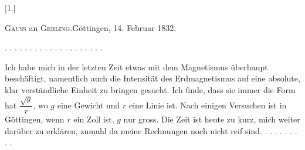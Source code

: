 \clearpage\begingroup{}\NoSourceHead
\begin{center}\Large{}\end{center}
\bigskip\begin{center}[1.]\end{center}
\begin{center}\textsc{Gauss} an \textsc{Gerling}.\quad Göttingen, 14. Februar 1832.\end{center}
\noindent . . . . . . . . . . . . . . . . . . . .\par
\indent Ich habe mich in der letzten Zeit etwas mit dem Magnetismus überhaupt
beschäftigt, namentlich auch die Intensität des Erdmagnetismus auf eine absolute,
klar verständliche Einheit zu bringen gesucht. Ich finde, dass sie
immer die Form hat \(\dfrac{\sqrt g}{r}\), wo \(g\) eine Gewicht und \(r\) eine Linie ist. Nach
einigen Versuchen ist in Göttingen, wenn \(r\) ein Zoll ist, \(g\) nur  gross. Die Zeit ist heute zu kurz, mich weiter darüber zu
erklären, zumahl da meine Rechnungen noch nicht reif sind. . . . . . . . . .
\clearpage\endgroup

